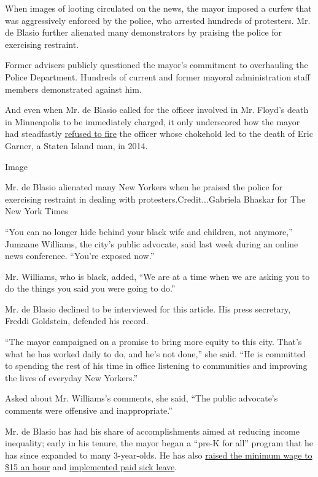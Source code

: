 When images of looting circulated on the news, the mayor imposed a
curfew that was aggressively enforced by the police, who arrested
hundreds of protesters. Mr. de Blasio further alienated many
demonstrators by praising the police for exercising restraint.

Former advisers publicly questioned the mayor's commitment to
overhauling the Police Department. Hundreds of current and former
mayoral administration staff members demonstrated against him.

And even when Mr. de Blasio called for the officer involved in Mr.
Floyd's death in Minneapolis to be immediately charged, it only
underscored how the mayor had steadfastly
\href{https://www.nytimes3xbfgragh.onion/2019/07/17/nyregion/eric-garner-de-blasio-pantaleo.html}{refused
to fire} the officer whose chokehold led to the death of Eric Garner, a
Staten Island man, in 2014.

Image

Mr. de Blasio alienated many New Yorkers when he praised the police for
exercising restraint in dealing with protesters.Credit...Gabriela
Bhaskar for The New York Times

``You can no longer hide behind your black wife and children, not
anymore,'' Jumaane Williams, the city's public advocate, said last week
during an online news conference. ``You're exposed now.''

Mr. Williams, who is black, added, ``We are at a time when we are asking
you to do the things you said you were going to do.''

Mr. de Blasio declined to be interviewed for this article. His press
secretary, Freddi Goldstein, defended his record.

``The mayor campaigned on a promise to bring more equity to this city.
That's what he has worked daily to do, and he's not done,'' she said.
``He is committed to spending the rest of his time in office listening
to communities and improving the lives of everyday New Yorkers.''

Asked about Mr. Williams's comments, she said, ``The public advocate's
comments were offensive and inappropriate.''

Mr. de Blasio has had his share of accomplishments aimed at reducing
income inequality; early in his tenure, the mayor began a ``pre-K for
all'' program that he has since expanded to many 3-year-olds. He has
also
\href{https://www.nytimes3xbfgragh.onion/2018/12/31/nyregion/15-minimum-wage-new-york.html}{raised
the minimum wage to \$15 an hour} and
\href{https://www.nytimes3xbfgragh.onion/2014/04/07/nyregion/new-yorks-paid-sick-leave-law-quietly-takes-effect.html}{implemented
paid sick leave}.

